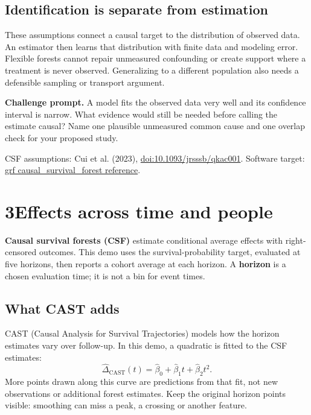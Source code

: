 \documentclass[11pt,letterpaper]{article}
\newcommand{\term}[1]{\textbf{\color{ink}#1}}
\newcommand{\source}[1]{{\small\color{muted}#1}}
\begin{document}
\subsection{Identification is separate from estimation}
These assumptions connect a causal target to the distribution of observed
data. An estimator then learns that distribution with finite data and modeling
error. Flexible forests cannot repair unmeasured confounding or create support
where a treatment is never observed. Generalizing to a different population
also needs a defensible sampling or transport argument.

\term{Challenge prompt.} A model fits the observed data very well and its
confidence interval is narrow. What evidence would still be needed before
calling the estimate causal? Name one plausible unmeasured common cause and
one overlap check for your proposed study.

\source{CSF assumptions: Cui et al. (2023),
\href{https://doi.org/10.1093/jrsssb/qkac001}{doi:10.1093/jrsssb/qkac001}.
Software target: \href{https://grf-labs.github.io/grf/reference/causal_survival_forest.html}{grf causal\_survival\_forest reference}.}

\newpage
\section{3\enspace Effects across time and people}
\term{Causal survival forests (CSF)} estimate conditional average effects with
right-censored outcomes. This demo uses the survival-probability target,
evaluated at five horizons, then reports a cohort average at each horizon.
A \term{horizon} is a chosen evaluation time; it is not a bin for event times.

\subsection{What CAST adds}
CAST (Causal Analysis for Survival Trajectories) models how the horizon
estimates vary over follow-up. In this demo, a quadratic is fitted to the CSF
estimates:
\[
 \widehat\Delta_{\mathrm{CAST}}(t)=\widehat\beta_0+
 \widehat\beta_1t+\widehat\beta_2t^2.
\]
More points drawn along this curve are predictions from that fit, not new
observations or additional forest estimates. Keep the original horizon points
visible: smoothing can miss a peak, a crossing or another feature.
\end{document}
